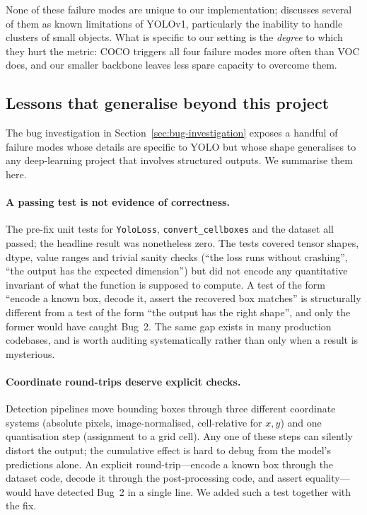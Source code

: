 \medskip

\noindent None of these failure modes are unique to our implementation;
\citet{redmon2016you} discusses several of them as known limitations of
YOLOv1, particularly the inability to handle clusters of small objects.
What is specific to our setting is the \emph{degree} to which they hurt the
metric: COCO triggers all four failure modes more often than VOC does, and
our smaller backbone leaves less spare capacity to overcome them.

\subsection{Lessons that generalise beyond this project}
\label{sec:disc:lessons}

The bug investigation in Section~\ref{sec:bug-investigation} exposes a
handful of failure modes whose details are specific to YOLO but whose shape
generalises to any deep-learning project that involves structured outputs.
We summarise them here.

\paragraph{A passing test is not evidence of correctness.} The pre-fix unit
tests for \texttt{YoloLoss}, \texttt{convert\_cellboxes} and the dataset all
passed; the headline result was nonetheless zero. The tests covered tensor
shapes, dtype, value ranges and trivial sanity checks (``the loss runs
without crashing'', ``the output has the expected dimension'') but did not
encode any quantitative invariant of what the function is supposed to
compute. A test of the form ``encode a known box, decode it, assert the
recovered box matches'' is structurally different from a test of the form
``the output has the right shape'', and only the former would have caught
Bug~2. The same gap exists in many production codebases, and is worth
auditing systematically rather than only when a result is mysterious.

\paragraph{Coordinate round-trips deserve explicit checks.} Detection
pipelines move bounding boxes through three different coordinate systems
(absolute pixels, image-normalised, cell-relative for $x,y$) and one
quantisation step (assignment to a grid cell). Any one of these steps can
silently distort the output; the cumulative effect is hard to debug from
the model's predictions alone. An explicit round-trip---encode a known box
through the dataset code, decode it through the post-processing code, and
assert equality---would have detected Bug~2 in a single line. We added such
a test together with the fix.

